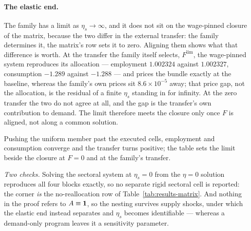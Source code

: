 \paragraph{The elastic end.} The family has a limit as $\eta_s\to\infty$, and it
does not sit on the wage-pinned closure of the matrix, because the two differ in
the external transfer: the family determines it, the matrix's row sets it to
zero. Aligning them shows what that difference is worth. At the transfer the
family itself selects, $F^{\mathrm{lim}}$, the wage-pinned system reproduces its
allocation --- employment $1.002324$ against $1.002327$, consumption $-1.289$
against $-1.288$ --- and prices the bundle exactly at the baseline, whereas the
family's own prices sit $8.6 \times 10^{-5}$ away; that price gap, not the
allocation, is the residual of a finite $\eta_s$ standing in for infinity. At the
zero transfer the two do not agree at all, and the gap is the transfer's own
contribution to demand. The limit therefore meets the closure only once $F$ is
aligned, not along a common solution.

Pushing the uniform member past the executed cells, employment and consumption converge and the transfer turns positive; the table sets the
limit beside the closure at $F = 0$ and at the family's transfer.



\emph{Two checks.} Solving the sectoral system at $\eta_s=0$ from the $\eta = 0$ solution reproduces all four blocks exactly, so no separate rigid
sectoral cell is reported: the corner \emph{is} the no-reallocation row of
Table~\ref{tab:results-matrix}. And nothing in the proof refers to $A\equiv\mathbf{1}$, so
the nesting survives supply shocks, under which the elastic end instead
separates and $\eta_s$ becomes identifiable --- whereas a demand-only
program leaves it a sensitivity parameter.
